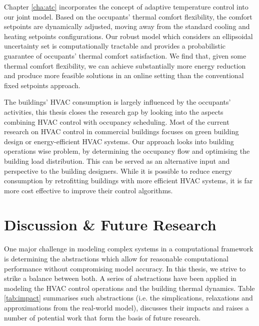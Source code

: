 Chapter \ref{cha:atc} incorporates the concept of adaptive temperature control into our joint model. Based on the occupants' thermal comfort flexibility, the comfort setpoints are dynamically adjusted, moving away from the standard cooling and heating setpoints configurations. Our robust model which considers an ellipsoidal uncertainty set is computationally tractable and provides a probabilistic guarantee of occupants' thermal comfort satisfaction. We find that, given some thermal comfort flexibility, we can achieve substantially more energy reduction and produce more feasible solutions in an online setting than the conventional fixed setpoints approach.

The buildings' HVAC consumption is largely influenced by the occupants' activities, this thesis closes the research gap by looking into the aspects combining HVAC control with occupancy scheduling. Most of the current research on HVAC control in commercial buildings focuses on green building design or energy-efficient HVAC systems. Our approach looks into building operations wise problem, by determining the occupancy flow and optimising the building load distribution. This can be served as an alternative input and perspective to the building designers. While it is possible to reduce energy consumption by retrofitting buildings with more efficient HVAC systems, it is far more cost effective to improve their control algorithms. 


%
%

\section{Discussion \& Future Research}


One major challenge in modeling complex systems in a computational framework is determining the abstractions which allow for reasonable computational performance without compromising model accuracy. In this thesis, we strive to strike a balance between both. A series of abstractions have been applied in modeling the HVAC control operations and the building thermal dynamics. Table \ref{tab:impact} summarises such abstractions (i.e. the simplications, relaxations and approximations from the real-world model), discusses their impacts and raises a number of potential work that form the basis of future research.

